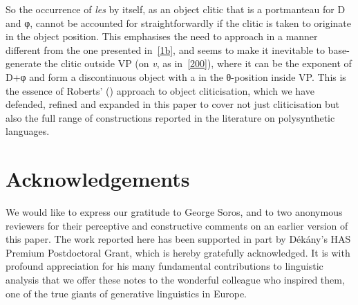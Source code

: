\documentclass[output=paper]{langsci/langscibook}
\begin{document}
\begin{refcontext}
So the occurrence of \emph{les} by itself, as an object clitic that is a
portmanteau for D and φ{}, cannot be accounted for straightforwardly if
the clitic is taken to originate in the object position. This emphasises the
need to approach  in a manner different from the one presented
in~\eqref{1b}, and seems to make it inevitable to base-generate the clitic
outside VP (on \emph{v}, as in~\ref{200}), where it can be the exponent of
D+φ{} and form a discontinuous object with a  in the
θ{}-position inside VP\@. This is the essence of Roberts'
(\citeyear{Roberts2010}) approach to object cliticisation, which we have
defended, refined and expanded in this paper to cover not just cliticisation
but also the full range of  constructions reported in the
literature on polysynthetic languages.

\printchapterglossary{}

\section*{Acknowledgements}
We would like to express our gratitude to George Soros, and to two anonymous
reviewers for their perceptive and constructive comments on an earlier version
of this paper. The work reported here has been  supported in part by Dékány's
HAS Premium Postdoctoral Grant, which is hereby gratefully acknowledged. It is
with profound appreciation for his many fundamental contributions to linguistic
analysis that we offer these notes to the wonderful colleague who inspired
them, one of the true giants of generative linguistics in Europe.
%

{\sloppy\printbibliography[heading=subbibliography,notkeyword=this]}

\end{refcontext}
\end{document}
